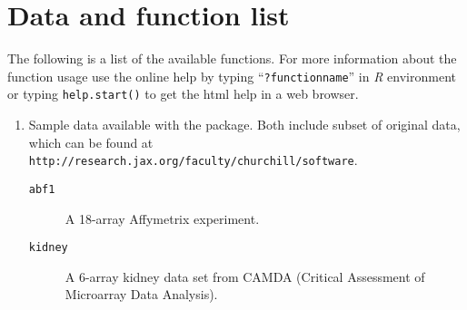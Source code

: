 \section{Data and function list}
The following is a list of the available functions. 
For more information about 
the function usage use the online help by typing ``{\tt ?functionname}''
in {\em R} environment or typing {\tt help.start()} to get the html help in 
a web browser.

\begin{enumerate}
\item Sample data available with the package. Both include subset of original
  data, which can be found at {\tt
http://research.jax.org/faculty/churchill/software}. 
\begin{description}
\item[{\tt abf1}] A 18-array Affymetrix experiment. 
\item[{\tt kidney}] A 6-array kidney data set from CAMDA (Critical Assessment of Microarray Data Analysis). 
\end{description}


\end{enumerate}
